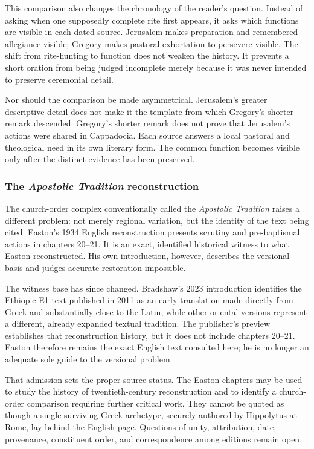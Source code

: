 This comparison also changes the chronology of the reader's question.
Instead of asking when one supposedly complete rite first appears, it asks
which functions are visible in each dated source. Jerusalem makes preparation
and remembered allegiance visible; Gregory makes pastoral exhortation to
persevere visible. The shift from rite-hunting to function does not weaken the
history. It prevents a short oration from being judged incomplete merely
because it was never intended to preserve ceremonial detail.

Nor should the comparison be made asymmetrical. Jerusalem's greater
descriptive detail does not make it the template from which Gregory's shorter
remark descended. Gregory's shorter remark does not prove that Jerusalem's
actions were shared in Cappadocia. Each source answers a local pastoral and
theological need in its own literary form. The common function becomes
visible only after the distinct evidence has been preserved.

\subsubsection{The \emph{Apostolic Tradition} reconstruction}

The church-order complex conventionally called the \emph{Apostolic Tradition}
raises a different problem: not merely regional variation, but the identity
of the text being cited. Easton's 1934 English reconstruction presents
scrutiny and pre-baptismal actions in chapters 20--21. It is an exact,
identified historical witness to what Easton reconstructed. His own
introduction, however, describes the versional basis and judges accurate
restoration impossible.

The witness base has since changed. Bradshaw's 2023 introduction identifies
the Ethiopic E1 text published in 2011 as an early translation made directly
from Greek and substantially close to the Latin, while other oriental
versions represent a different, already expanded textual tradition. The
publisher's preview establishes that reconstruction history, but it does not
include chapters 20--21. Easton therefore remains the exact English text
consulted here; he is no longer an adequate sole guide to the versional
problem.

That admission sets the proper source status. The Easton chapters may be used
to study the history of twentieth-century reconstruction and to identify a
church-order comparison requiring further critical work. They cannot be
quoted as though a single surviving Greek archetype, securely authored by
Hippolytus at Rome, lay behind the English page. Questions of unity,
attribution, date, provenance, constituent order, and correspondence among
editions remain open.

